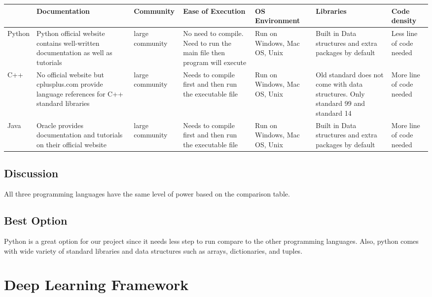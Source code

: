 \documentclass{scrreprt}
\begin{document}
\begin{tabular}{|l|l|l|l|l|l|l|}
  \hline
   & Documentation & Community  & Ease of Execution & OS Environment & Libraries & Code density \\ \hline
 \parbox{1cm}{Python} & \parbox{2cm}{Python official website contains well-written documentation as well as tutorials}  & \parbox{2cm}{large community}  & \parbox{2cm}{No need to compile. Need to run the main file then program will execute}  & \parbox{2cm}{Run on Windows, Mac OS, Unix } & \parbox{2cm}{Built in Data structures and extra packages by default} & \parbox{2cm}{Less line of code needed }  \\ \hline
 \parbox{1cm}{C++} & \parbox{2cm}{No official website but cplusplus.com provide language references for C++ standard libraries}  &  \parbox{2cm}{large community} &  \parbox{2cm}{Needs to compile first and then run the executable file} &  \parbox{2cm}{Run on Windows, Mac OS, Unix} & \parbox{2cm}{Old standard does not come with data structures. Only standard 99 and standard 14} &  \parbox{2cm}{More line of code needed} \\ \hline
 \parbox{1cm}{Java} &  \parbox{2cm}{Oracle provides documentation and tutorials on their official website}  &   \parbox{2cm}{large community} &  \parbox{2cm}{Needs to compile first and then run the executable file} &  \parbox{2cm}{Run on Windows, Mac OS, Unix} &  \parbox{2cm}{Built in Data structures and extra packages by default} &  \parbox{2cm}{More line of code needed} \\ \hline
\end{tabular}


\subsection{Discussion}
All three programming languages have the same level of power based on the comparison table.

\subsection{Best Option}
Python is a great option for our project since it needs less step to run compare to the other
programming languages. Also, python comes with wide variety of standard libraries and data structures such as
arrays, dictionaries, and tuples.


\section{Deep Learning Framework}
\end{document}
